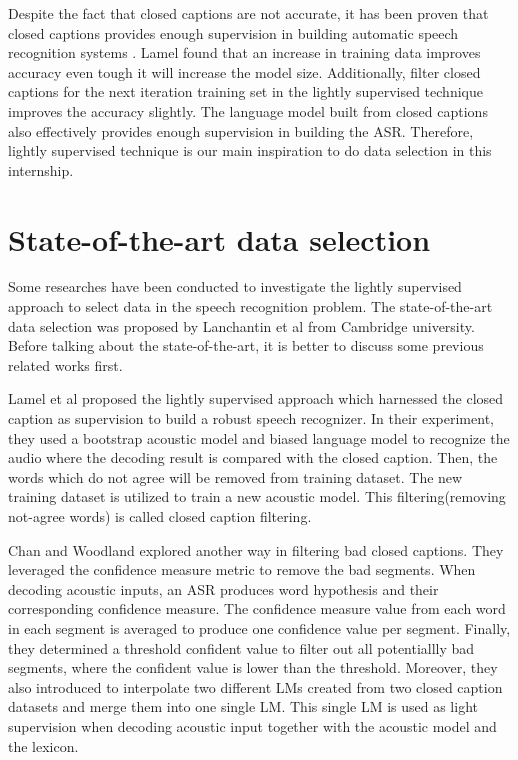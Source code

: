 Despite the fact that closed captions are not accurate, it has been proven that closed captions provides enough supervision in building automatic speech recognition systems \cite{lightlySupervised}. Lamel found that an increase in training data improves accuracy even tough it will increase the model size. Additionally, filter closed captions for the next iteration training set in the lightly supervised technique improves the accuracy slightly. The language model built from closed captions also effectively provides enough supervision in building the ASR. Therefore, lightly supervised technique is our main inspiration to do data selection in this internship.

\section{State-of-the-art data selection}
Some researches have been conducted to investigate the lightly supervised approach to select data in the speech recognition problem\cite{lightlySupervised,Lecouteux06imperfecttranscript,Chan,Mathias,Stolcke00anefficient}. The state-of-the-art data selection was proposed by  Lanchantin et al from Cambridge university\cite{Lanchantin2016}. Before talking about the state-of-the-art, it is better to discuss some previous related works first.

Lamel et al proposed the lightly supervised approach which harnessed the closed caption as supervision to build a robust speech recognizer\cite{lightlySupervised}. In their experiment, they used a bootstrap acoustic model and biased language model to recognize the audio where the decoding result is compared with the closed caption. Then, the words which do not agree will be removed from training dataset. The new training dataset is utilized to train a  new acoustic model. This filtering(removing not-agree words) is called closed caption filtering.

Chan and Woodland explored another way in filtering bad closed captions\cite{Chan}. They leveraged the confidence measure metric to remove the bad segments. When decoding acoustic inputs, an ASR produces word hypothesis and their corresponding confidence measure. The confidence measure value from each word in  each segment is averaged to produce one confidence value per segment. Finally, they determined a threshold confident value to filter out all potentiallly bad segments, where the confident value is lower than the threshold. Moreover, they also introduced to interpolate two different LMs created from two closed caption datasets and merge them into one single LM. This single LM is used as light supervision when decoding acoustic input together with the acoustic model and the lexicon.

